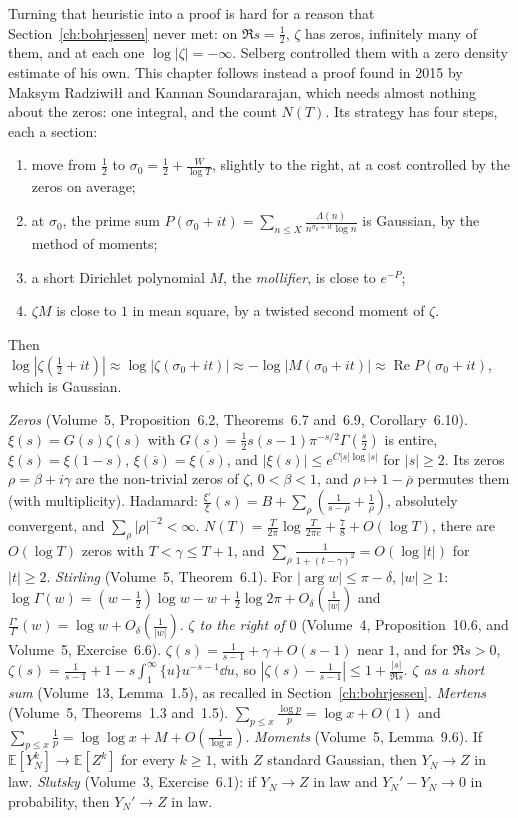 Turning that heuristic into a proof is hard for a reason that Section~\ref{ch:bohrjessen} never met: on $\Re s=\frac12$, $\zeta$ has zeros, infinitely many of them, and at each one $\log|\zeta|=-\infty$. Selberg controlled them with a zero density estimate of his own. This chapter follows instead a proof found in 2015 by Maksym Radziwi\l\l{} and Kannan Soundararajan, which needs almost nothing about the zeros: one integral, and the count $N(T)$. Its strategy has four steps, each a section:
\begin{enumerate}
\item move from $\frac12$ to $\sigma_0=\frac12+\frac W{\log T}$, slightly to the right, at a cost controlled by the zeros on average;
\item at $\sigma_0$, the prime sum $P(\sigma_0+it)=\sum_{n\le X}\frac{\Lambda(n)}{n^{\sigma_0+it}\log n}$ is Gaussian, by the method of moments;
\item a short Dirichlet polynomial $M$, the \emph{mollifier}, is close to $e^{-P}$;
\item $\zeta M$ is close to $1$ in mean square, by a twisted second moment of $\zeta$.
\end{enumerate}
Then $\log|\zeta(\frac12+it)|\approx\log|\zeta(\sigma_0+it)|\approx-\log|M(\sigma_0+it)|\approx\operatorname{Re}P(\sigma_0+it)$, which is Gaussian.

\begin{reminder}
\emph{Zeros} (Volume~5, Proposition~6.2, Theorems~6.7 and~6.9, Corollary~6.10). $\xi(s)=G(s)\zeta(s)$ with $G(s)=\frac12s(s-1)\pi^{-s/2}\Gamma(\frac s2)$ is entire, $\xi(s)=\xi(1-s)$, $\xi(\overline s)=\overline{\xi(s)}$, and $|\xi(s)|\le e^{C|s|\log|s|}$ for $|s|\ge2$. Its zeros $\rho=\beta+i\gamma$ are the non-trivial zeros of $\zeta$, $0<\beta<1$, and $\rho\mapsto1-\overline\rho$ permutes them (with multiplicity). Hadamard: $\frac{\xi'}\xi(s)=B+\sum_\rho(\frac1{s-\rho}+\frac1\rho)$, absolutely convergent, and $\sum_\rho|\rho|^{-2}<\infty$. $N(T)=\frac T{2\pi}\log\frac T{2\pi e}+\frac78+O(\log T)$, there are $O(\log T)$ zeros with $T<\gamma\le T+1$, and $\sum_\rho\frac1{1+(t-\gamma)^2}=O(\log|t|)$ for $|t|\ge2$.
\emph{Stirling} (Volume~5, Theorem~6.1). For $|\arg w|\le\pi-\delta$, $|w|\ge1$: $\log\Gamma(w)=(w-\frac12)\log w-w+\frac12\log2\pi+O_\delta(\frac1{|w|})$ and $\frac{\Gamma'}\Gamma(w)=\log w+O_\delta(\frac1{|w|})$.
\emph{$\zeta$ to the right of $0$} (Volume~4, Proposition~10.6, and Volume~5, Exercise~6.6). $\zeta(s)=\frac1{s-1}+\gamma+O(s-1)$ near $1$, and for $\Re s>0$, $\zeta(s)=\frac1{s-1}+1-s\int_1^\infty\{u\}u^{-s-1}\dd u$, so $|\zeta(s)-\frac1{s-1}|\le1+\frac{|s|}{\Re s}$.
\emph{$\zeta$ as a short sum} (Volume~13, Lemma~1.5), as recalled in Section~\ref{ch:bohrjessen}.
\emph{Mertens} (Volume~5, Theorems~1.3 and~1.5). $\sum_{p\le x}\frac{\log p}p=\log x+O(1)$ and $\sum_{p\le x}\frac1p=\log\log x+M+O(\frac1{\log x})$.
\emph{Moments} (Volume~5, Lemma~9.6). If $\mathbb E[Y_N^k]\to\mathbb E[Z^k]$ for every $k\ge1$, with $Z$ standard Gaussian, then $Y_N\to Z$ in law. \emph{Slutsky} (Volume~3, Exercise~6.1): if $Y_N\to Z$ in law and $Y_N'-Y_N\to0$ in probability, then $Y_N'\to Z$ in law.
\end{reminder}

